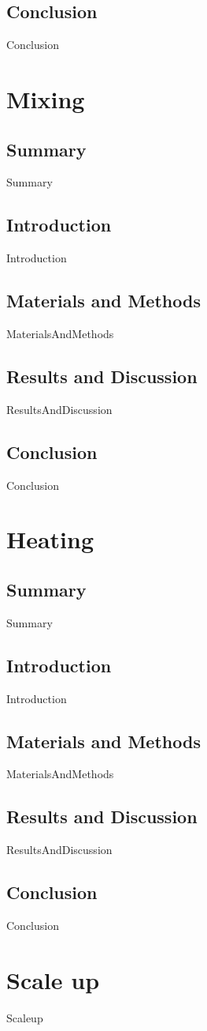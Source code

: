 \documentclass[12pt,a4paper]{report}
\begin{document}
    \subsection{Conclusion}
        {Conclusion}
        
        \section{Mixing}
    \subsection{Summary}
        {Summary}
    \subsection{Introduction}
        {Introduction}
    \subsection{Materials and Methods}
        {MaterialsAndMethods}
    \subsection{Results and Discussion}
		{ResultsAndDiscussion}
    \subsection{Conclusion}
        {Conclusion}
        
        \section{Heating}
    \subsection{Summary}
        {Summary}
    \subsection{Introduction}
        {Introduction}
    \subsection{Materials and Methods}
        {MaterialsAndMethods}
    \subsection{Results and Discussion}
		{ResultsAndDiscussion}
    \subsection{Conclusion}
        {Conclusion}
    \section{Scale up}
        {Scaleup}
\pagebreak
    
\end{document}
